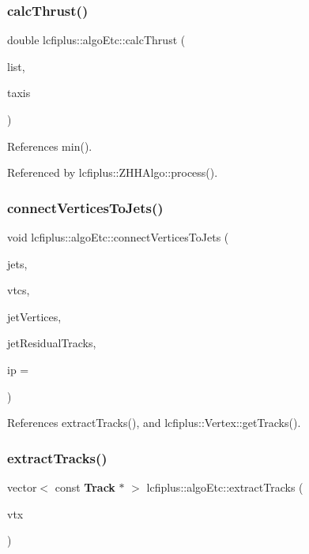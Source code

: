 \subsubsection{calc\+Thrust()}
{\footnotesize\ttfamily double lcfiplus\+::algo\+Etc\+::calc\+Thrust (\begin{DoxyParamCaption}\item[{vector$<$ T\+Vector3 $>$ \&}]{list,  }\item[{T\+Vector3 \&}]{taxis }\end{DoxyParamCaption})}



References min().



Referenced by lcfiplus\+::\+Z\+H\+H\+Algo\+::process().

\mbox{\label{namespacelcfiplus_1_1algoEtc_a7328dfd3eef6db40f96b389c6c39d555}} 
\subsubsection{connect\+Vertices\+To\+Jets()}
{\footnotesize\ttfamily void lcfiplus\+::algo\+Etc\+::connect\+Vertices\+To\+Jets (\begin{DoxyParamCaption}\item[{const \textbf{ Jet\+Vec} \&}]{jets,  }\item[{const vector$<$ \textbf{ Vertex} $\ast$$>$ \&}]{vtcs,  }\item[{vector$<$ vector$<$ \textbf{ Vertex} $\ast$$>$ $>$ \&}]{jet\+Vertices,  }\item[{vector$<$ vector$<$ const \textbf{ Track} $\ast$$>$ $>$ \&}]{jet\+Residual\+Tracks,  }\item[{const \textbf{ Vertex} $\ast$}]{ip = {} }\end{DoxyParamCaption})}



References extract\+Tracks(), and lcfiplus\+::\+Vertex\+::get\+Tracks().

\mbox{\label{namespacelcfiplus_1_1algoEtc_a48f75f12d0bf702688e2824e35ee283c}} 
\subsubsection{extract\+Tracks()}
{\footnotesize\ttfamily vector$<$ const \textbf{ Track} $\ast$ $>$ lcfiplus\+::algo\+Etc\+::extract\+Tracks (\begin{DoxyParamCaption}\item[{\textbf{ Vertex\+Vec} \&}]{vtx }\end{DoxyParamCaption})}



